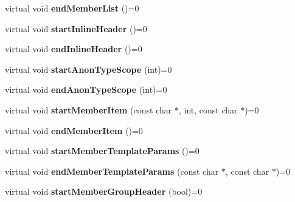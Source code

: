 \begin{DoxyCompactItemize}
\item 
\hypertarget{class_output_generator_ac05733489de3eb28a87ddaf320c70b97}{virtual void {\bfseries end\-Member\-List} ()=0}\label{class_output_generator_ac05733489de3eb28a87ddaf320c70b97}

\item 
\hypertarget{class_output_generator_a1336e0da6fc4d269bbc001e39a961c6e}{virtual void {\bfseries start\-Inline\-Header} ()=0}\label{class_output_generator_a1336e0da6fc4d269bbc001e39a961c6e}

\item 
\hypertarget{class_output_generator_a062f6fc54b726155c833a6f8b9cc1cfa}{virtual void {\bfseries end\-Inline\-Header} ()=0}\label{class_output_generator_a062f6fc54b726155c833a6f8b9cc1cfa}

\item 
\hypertarget{class_output_generator_a64f32fcb6936120b814a906dfb08d46d}{virtual void {\bfseries start\-Anon\-Type\-Scope} (int)=0}\label{class_output_generator_a64f32fcb6936120b814a906dfb08d46d}

\item 
\hypertarget{class_output_generator_ab28edc66275af2c6d0857371babc2781}{virtual void {\bfseries end\-Anon\-Type\-Scope} (int)=0}\label{class_output_generator_ab28edc66275af2c6d0857371babc2781}

\item 
\hypertarget{class_output_generator_ae7a2358a2130c772ea1fb58157d8eff6}{virtual void {\bfseries start\-Member\-Item} (const char $\ast$, int, const char $\ast$)=0}\label{class_output_generator_ae7a2358a2130c772ea1fb58157d8eff6}

\item 
\hypertarget{class_output_generator_a64c1b56c3825737400731e38aff68c51}{virtual void {\bfseries end\-Member\-Item} ()=0}\label{class_output_generator_a64c1b56c3825737400731e38aff68c51}

\item 
\hypertarget{class_output_generator_a4797b2161babe0834e1f97f551a54301}{virtual void {\bfseries start\-Member\-Template\-Params} ()=0}\label{class_output_generator_a4797b2161babe0834e1f97f551a54301}

\item 
\hypertarget{class_output_generator_a508fca5f65543e658d63e3f42fd8f73a}{virtual void {\bfseries end\-Member\-Template\-Params} (const char $\ast$, const char $\ast$)=0}\label{class_output_generator_a508fca5f65543e658d63e3f42fd8f73a}

\item 
\hypertarget{class_output_generator_a21395eee356948ffad75ffc98e65b7ce}{virtual void {\bfseries start\-Member\-Group\-Header} (bool)=0}\label{class_output_generator_a21395eee356948ffad75ffc98e65b7ce}


\end{DoxyCompactItemize}
